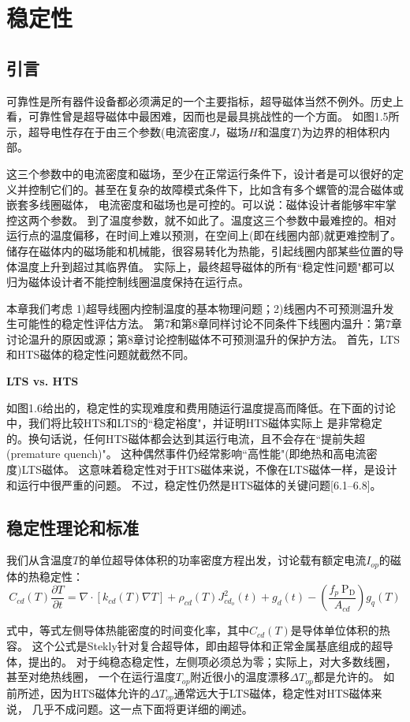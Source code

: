 \chapter{稳定性}
\section{引言}
可靠性是所有器件设备都必须满足的一个主要指标，超导磁体当然不例外。历史上看，可靠性曾是超导磁体中最困难，因而也是最具挑战性的一个方面。
如图1.5所示，超导电性存在于由三个参数(电流密度$J$，磁场$H$和温度$T$)为边界的相体积内部。

这三个参数中的电流密度和磁场，至少在正常运行条件下，设计者是可以很好的定义并控制它们的。甚至在复杂的故障模式条件下，比如含有多个螺管的混合磁体或嵌套多线圈磁体，
电流密度和磁场也是可控的。可以说：磁体设计者能够牢牢掌控这两个参数。
到了温度参数，就不如此了。温度这三个参数中最难控的。相对运行点的温度偏移，在时间上难以预测，在空间上(即在线圈内部)就更难控制了。
储存在磁体内的磁场能和机械能，很容易转化为热能，引起线圈内部某些位置的导体温度上升到超过其临界值。
实际上，最终超导磁体的所有``稳定性问题"都可以归为磁体设计者不能控制线圈温度保持在运行点。

本章我们考虑 1)超导线圈内控制温度的基本物理问题；2)线圈内不可预测温升发生可能性的稳定性评估方法。
第7和第8章同样讨论不同条件下线圈内温升：第7章讨论温升的原因或源；第8章讨论控制磁体不可预测温升的保护方法。
首先，LTS和HTS磁体的稳定性问题就截然不同。

\textbf{LTS vs. HTS}

如图1.6给出的，稳定性的实现难度和费用随运行温度提高而降低。在下面的讨论中，我们将比较HTS和LTS的``稳定裕度"，并证明HTS磁体实际上
是非常稳定的。换句话说，任何HTS磁体都会达到其运行电流，且不会存在``提前失超(premature quench)"。
这种偶然事件仍经常影响``高性能"(即绝热和高电流密度)LTS磁体。
这意味着稳定性对于HTS磁体来说，不像在LTS磁体一样，是设计和运行中很严重的问题。
不过，稳定性仍然是HTS磁体的关键问题[6.1–6.8]。

\section{稳定性理论和标准}
我们从含温度$T$的单位超导体体积的功率密度方程出发，讨论载有额定电流$I_{op}$的磁体的热稳定性：
\begin{equation}
C_{cd}(T)\frac{\partial T}{\partial t}=\nabla ·[k_{cd}(T)\nabla T]+\rho_{cd}(T)J_{cd_o}^2(t)+g_d(t)-(\frac{f_p\ \mathrm{P_D}}{A_{cd}})g_q(T)
\end{equation}

式中，等式左侧导体热能密度的时间变化率，其中$C_{cd}(T)$是导体单位体积的热容。
这个公式是Stekly针对复合超导体，即由超导体和正常金属基底组成的超导体，提出的。
对于纯稳态稳定性，左侧项必须总为零；实际上，对大多数线圈，甚至对绝热线圈，
一个在运行温度$T_{op}$附近很小的温度漂移$\Delta T_{op}$都是允许的。
如前所述，因为HTS磁体允许的$\Delta T_{op}$通常远大于LTS磁体，稳定性对HTS磁体来说，
几乎不成问题。这一点下面将更详细的阐述。

